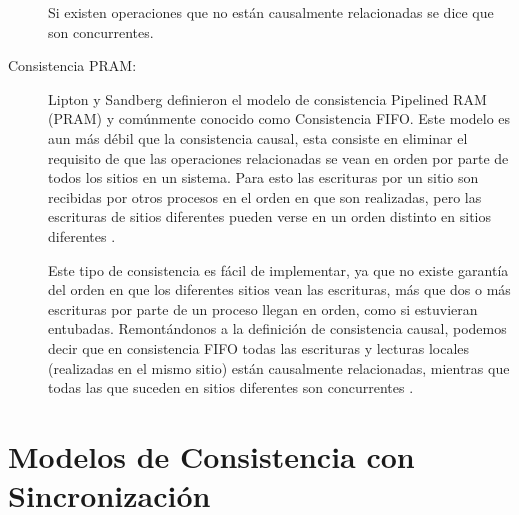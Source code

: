 \begin{description}
Si existen operaciones que no están causalmente relacionadas se dice que son concurrentes.

\item[Consistencia PRAM: ]
Lipton y Sandberg \cite{lipton:1988} definieron el modelo de consistencia Pipelined RAM (PRAM) y comúnmente conocido como Consistencia FIFO. Este modelo es aun más débil que la consistencia causal, esta consiste en eliminar el requisito de que las operaciones relacionadas se vean en orden por parte de todos los sitios en un sistema. Para esto las escrituras por un sitio son recibidas por otros procesos en el orden en que son realizadas, pero las escrituras de sitios diferentes pueden verse en un orden distinto en sitios diferentes \cite{mosberger:1993}.

Este tipo de consistencia es fácil de implementar, ya que no existe garantía del orden en que los diferentes sitios vean las escrituras, más que dos o más escrituras por parte de un proceso llegan en orden, como si estuvieran entubadas. Remontándonos a la definición de consistencia causal, podemos decir que en consistencia FIFO todas las escrituras y lecturas locales (realizadas en el mismo sitio) están causalmente relacionadas, mientras que todas las que suceden en sitios diferentes son concurrentes \cite{mosberger:1993}.


\end{description}


\section{Modelos de Consistencia con Sincronización}

